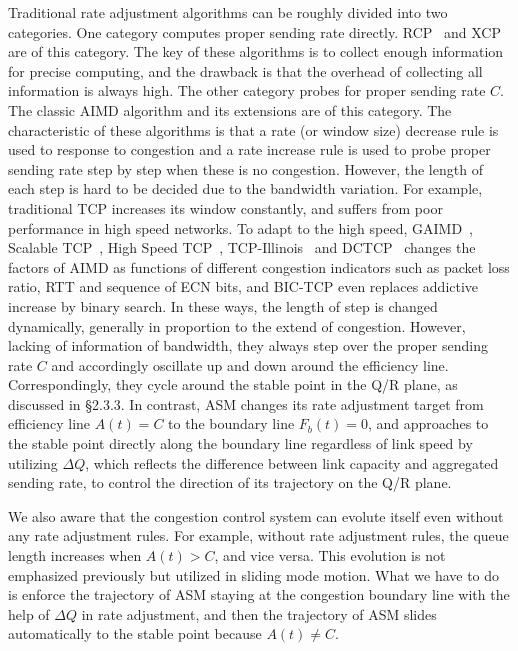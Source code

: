 \documentclass{sig-alternate-10pt}
\begin{document}
Traditional rate adjustment algorithms can be roughly divided into two categories. One category computes proper sending rate directly. RCP~\cite{RCP} and XCP~\cite{XCP} are of this category. The key of these algorithms is to collect enough information for precise computing, and the drawback is that the overhead of collecting all information is always high. The other category probes for proper sending rate $C$. The classic AIMD algorithm and its extensions are of this category. The characteristic of these algorithms is that a rate (or window size) decrease rule is used to response to congestion and a rate increase rule is used to probe proper sending rate step by step when these is no congestion. However, the length of each step is hard to be decided due to the bandwidth variation. For example, traditional TCP increases its window constantly, and suffers from poor performance in high speed networks. To adapt to the high speed, GAIMD~\cite{GAIMD}, Scalable TCP~\cite{S-TCP}, High Speed TCP~\cite{HS-TCP}, TCP-Illinois~\cite{illinois} and DCTCP~\cite{DCTCP} changes the factors of AIMD as functions of different congestion indicators such as packet loss ratio, RTT and sequence of ECN bits, and BIC-TCP even replaces addictive increase by binary search. In these ways, the length of step is changed dynamically, generally in proportion to the extend of congestion. However, lacking of information of bandwidth, they always step over the proper sending rate $C$ and accordingly oscillate up and down around the efficiency line. Correspondingly, they cycle around the stable point in the Q/R plane, as discussed in \S2.3.3. In contrast, ASM changes its rate adjustment target from efficiency line $A(t)=C$ to the boundary line $F_b(t)=0$, and approaches to the stable point directly along the boundary line regardless of link speed by utilizing $\Delta Q$, which reflects the difference between link capacity and aggregated sending rate, to control the direction of its trajectory on the Q/R plane.



We also aware that the congestion control system can evolute itself even without any rate adjustment rules. For example, without rate adjustment rules, the queue length increases when $A(t)>C$, and vice versa. This evolution is not emphasized previously but utilized in sliding mode motion. What we have to do is enforce the trajectory of ASM staying at the congestion boundary line with the help of $\Delta Q$ in rate adjustment, and then the trajectory of ASM slides automatically to the stable point because $A(t)\neq C$. 
\end{document}

